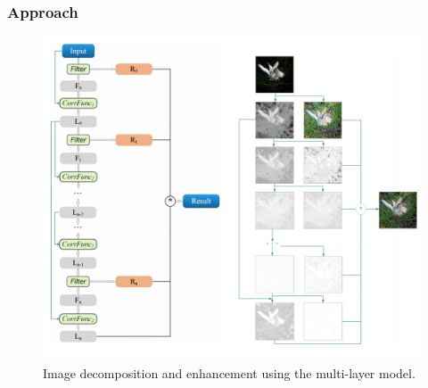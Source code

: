\documentclass[a4paper]{ctexart}
\begin{document}
	\subsubsection{Approach}
	
	\begin{figure}[htbp]
		\centering 
		\includegraphics[width=0.7\columnwidth]{picture/LLIE/Fusion-based/decomposition and enhancement}
		\caption{
			\label{fig: decomposition and enhancement} 
			Image decomposition and enhancement using the multi-layer model.
		}
	\end{figure}
	
\end{document}
